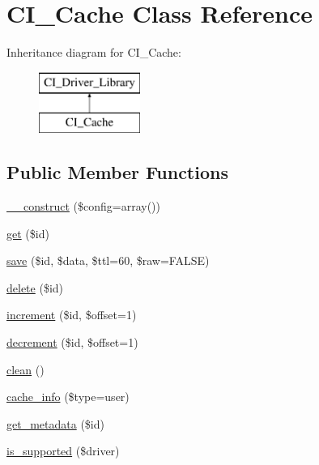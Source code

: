 \hypertarget{class_c_i___cache}{}\section{C\+I\+\_\+\+Cache Class Reference}
\label{class_c_i___cache}
Inheritance diagram for C\+I\+\_\+\+Cache\+:\begin{figure}[H]
\begin{center}
\leavevmode
\includegraphics[height=2.000000cm]{class_c_i___cache}
\end{center}
\end{figure}
\subsection*{Public Member Functions}
\begin{DoxyCompactItemize}
\item 
\mbox{\hyperlink{class_c_i___cache_af7f9493844d2d66e924e3c1df51ce616}{\+\_\+\+\_\+construct}} (\$config=array())
\item 
\mbox{\hyperlink{class_c_i___cache_a50e3bfb586b2f42932a6a93f3fbb0828}{get}} (\$id)
\item 
\mbox{\hyperlink{class_c_i___cache_a472645db04a8ce4b040b789a3062a7d2}{save}} (\$id, \$data, \$ttl=60, \$raw=F\+A\+L\+SE)
\item 
\mbox{\hyperlink{class_c_i___cache_a2f8258add505482d7f00ea26493a5723}{delete}} (\$id)
\item 
\mbox{\hyperlink{class_c_i___cache_a2f07a4e09b57f4460d49852497d1808f}{increment}} (\$id, \$offset=1)
\item 
\mbox{\hyperlink{class_c_i___cache_a4eb1c2772c8efc48c411ea060dd040b7}{decrement}} (\$id, \$offset=1)
\item 
\mbox{\hyperlink{class_c_i___cache_adb40b812890a8bc058bf6b7a0e1a54d9}{clean}} ()
\item 
\mbox{\hyperlink{class_c_i___cache_a26b8f7eef651dc3c0b5b9e1d8661a9ae}{cache\+\_\+info}} (\$type=\textquotesingle{}user\textquotesingle{})
\item 
\mbox{\hyperlink{class_c_i___cache_a59635cf18e997c5141bffa05ff7622e0}{get\+\_\+metadata}} (\$id)
\item 
\mbox{\hyperlink{class_c_i___cache_a6901d466745bfdfe4dc772fa012c99eb}{is\+\_\+supported}} (\$driver)
\end{DoxyCompactItemize}

